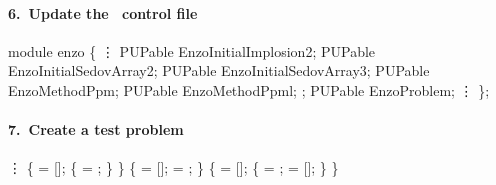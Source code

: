 
\begin{frame}[fragile] 
\secframetitle{\ssAddMethod}
\framesubtitle{6.~Update the \charm\ control file }

\footnotesize
\begin{semiverbatim}
   module enzo \{
       \vdots
     PUPable EnzoInitialImplosion2;
     PUPable EnzoInitialSedovArray2;
     PUPable EnzoInitialSedovArray3;
     PUPable EnzoMethodPpm;
     PUPable EnzoMethodPpml;
      ;
     PUPable EnzoProblem;
       \vdots
   \};
\end{semiverbatim}
\end{frame}



\begin{frame}[fragile] 
\secframetitle{\ssAddMethod}
\framesubtitle{7.~Create a  test problem}
\scriptsize
\vspace{-0.15in}
\begin{semiverbatim}
      \vdots
    \{
      = []; 
      \{  = ; \} 
   \}
\pause
    \{
       = [];
       = ;
   \}
\pause
    \{
       = [];
       \{
          = ;
          = [];
      \}
   \}
\end{semiverbatim}

\end{frame}


